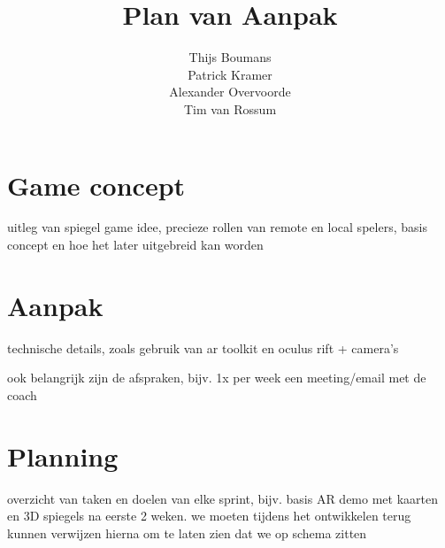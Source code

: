 \documentclass[11pt] {article}
\title{Plan van Aanpak}
\author{Thijs Boumans\\ Patrick Kramer\\ Alexander Overvoorde\\ Tim van Rossum}
\date{}
\begin{document}
\maketitle

\section{Game concept}

uitleg van spiegel game idee, precieze rollen van remote en local spelers, basis concept en hoe het later uitgebreid kan worden

\section{Aanpak}

technische details, zoals gebruik van ar toolkit en oculus rift + camera's

ook belangrijk zijn de afspraken, bijv. 1x per week een meeting/email met de coach

\section{Planning}

overzicht van taken en doelen van elke sprint, bijv. basis AR demo met kaarten en 3D spiegels na eerste 2 weken. we moeten tijdens het ontwikkelen terug kunnen verwijzen hierna om te laten zien dat we op schema zitten
\end{document}
